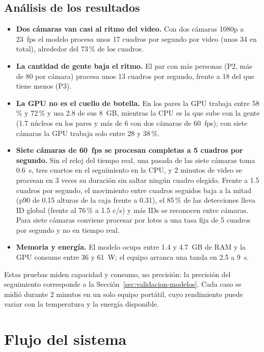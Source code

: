 \documentclass[12pt,a4paper]{article}
\begin{document}
\subsection{Análisis de los resultados}

\begin{itemize}
    \item \textbf{Dos cámaras van casi al ritmo del video.} Con dos cámaras
    1080p a 23~fps el modelo procesa unos 17 cuadros por segundo por video
    (unos 34 en total), alrededor del 73\,\% de los cuadros.
    \item \textbf{La cantidad de gente baja el ritmo.} El par con más personas
    (P2, más de 80 por cámara) procesa unos 13 cuadros por segundo, frente a
    18 del que tiene menos (P3).
    \item \textbf{La GPU no es el cuello de botella.} En los pares la GPU
    trabaja entre 58\,\% y 72\,\% y usa 2.8 de sus 8~GB, mientras la CPU es la
    que sube con la gente (1.7 núcleos en los pares y más de 6 con dos cámaras
    de 60~fps); con siete cámaras la GPU trabaja solo entre 28 y 38\,\%.
    \item \textbf{Siete cámaras de 60~fps se procesan completas a 5 cuadros
    por segundo.} Sin el reloj del tiempo real, una pasada de las siete
    cámaras toma 0.6~s, tres cuartos en el seguimiento en la CPU, y 2 minutos
    de video se procesan en 3 veces su duración sin saltar ningún cuadro
    elegido. Frente a 1.5 cuadros por segundo, el movimiento entre cuadros
    seguidos baja a la mitad (p90 de 0.15 alturas de la caja frente a 0.31),
    el 85\,\% de las detecciones lleva ID global (frente al 76\,\% a 1.5 c/s) y más IDs se
    reconocen entre cámaras. Para siete cámaras conviene procesar por lotes a
    una tasa fija de 5 cuadros por segundo y no en tiempo real.
    \item \textbf{Memoria y energía.} El modelo ocupa entre 1.4 y 4.7~GB de
    RAM y la GPU consume entre 36 y 61~W; el equipo arranca una tanda en 2.5 a
    9~s.
\end{itemize}

Estas pruebas miden capacidad y consumo, no precisión: la precisión del
seguimiento corresponde a la Sección~\ref{sec:validacion-modelos}.
Cada caso se midió durante 2 minutos en un solo equipo portátil, cuyo
rendimiento puede variar con la temperatura y la energía disponible.

\section{Flujo del sistema}
\label{sec:flujo-sistema}
\end{document}
